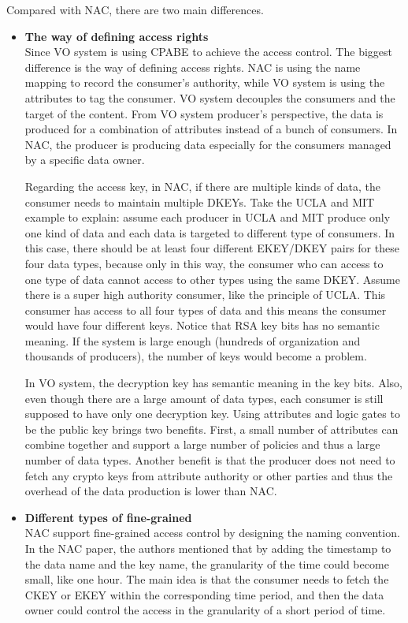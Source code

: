 Compared with NAC, there are two main differences.
\begin{itemize}
\item \textbf{The way of defining access rights} \\
Since VO system is using CPABE to achieve the access control.
The biggest difference is the way of defining access rights.
NAC is using the name mapping to record the consumer's authority, while VO system is using the attributes to tag the consumer.
VO system decouples the consumers and the target of the content.
From VO system producer's perspective, the data is produced for a combination of attributes instead of a bunch of consumers.
In NAC, the producer is producing data especially for the consumers managed by a specific data owner.

Regarding the access key, in NAC, if there are multiple kinds of data, the consumer needs to maintain multiple DKEYs.
Take the UCLA and MIT example to explain: assume each producer in UCLA and MIT produce only one kind of data and each data is targeted to different type of consumers.
In this case, there should be at least four different EKEY/DKEY pairs for these four data types, because only in this way, the consumer who can access to one type of data cannot access to other types using the same DKEY.
Assume there is a super high authority consumer, like the principle of UCLA.
This consumer has access to all four types of data and this means the consumer would have four different keys.
Notice that RSA key bits has no semantic meaning.
If the system is large enough (hundreds of organization and thousands of producers), the number of keys would become a problem.

In VO system, the decryption key has semantic meaning in the key bits.
Also, even though there are a large amount of data types, each consumer is still supposed to have only one decryption key.
Using attributes and logic gates to be the public key brings two benefits.
First, a small number of attributes can combine together and support a large number of policies and thus a large number of data types.
Another benefit is that the producer does not need to fetch any crypto keys from attribute authority or other parties and thus the overhead of the data production is lower than NAC.

\item \textbf{Different types of fine-grained} \\
NAC support fine-grained access control by designing the naming convention.
In the NAC paper, the authors mentioned that by adding the timestamp to the data name and the key name, the granularity of the time could become small, like one hour.
The main idea is that the consumer needs to fetch the CKEY or EKEY within the corresponding time period, and then the data owner could control the access in the granularity of a short period of time.


\end{itemize}

